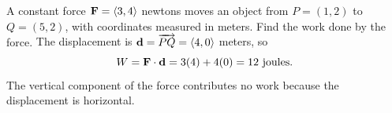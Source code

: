 \documentclass[11pt]{article}
\begin{document}
\begin{example}{A constant force $\mathbf{F}=\left\langle 3,4\right\rangle$ newtons moves an object
from $P=(1,2)$ to $Q=(5,2)$, with coordinates measured in meters.
Find the work done by the force.}
The displacement is $\mathbf{d}=\overrightarrow{PQ}=\left\langle 4,0\right\rangle$ meters, so
\[
 W=\mathbf{F}\cdot\mathbf{d}=3(4)+4(0)=12\text{ joules}.
\]
The vertical component of the force contributes no work because the
displacement is horizontal.
\end{example}
\end{document}
